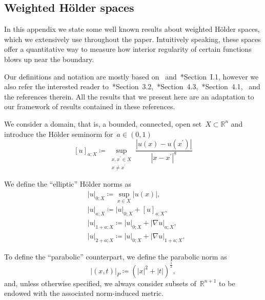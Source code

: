 \documentclass[12pt,a4paper]{amsart}
\numberwithin{equation}{section}
\theoremstyle{definition}
\theoremstyle{remark}
\newcommand{\R}{\mathbb{R}}
\newcommand{\abs}[1]{\left\lvert#1\right\rvert}
\begin{document}
\begin{appendix}

\section{Weighted Hölder spaces}\label{APP::WeightedHolder}

In this appendix we state some well known results about weighted Hölder spaces, which we extensively use throughout the paper. Intuitively speaking, these spaces offer a quantitative way to measure how interior regularity of certain functions blows up near the boundary.

Our definitions and notation are mostly based on~\cite{MR826642} and~\cite{MR241822}*{Section~I.1}, however we also refer the interested reader to~\cite{MR244627}*{Section~3.2},~\cite{MR1814364}*{Section~4.3},~\cite{MR1465184}*{Section~4.1},~\cite{MR588031} and the references therein. All the results that we present here are an adaptation to our framework of results contained in these references.

We consider a domain, that is, a bounded, connected, open set~$X \subset \R^n$ and introduce the Hölder seminorm for~$a \in (0,1)$
\begin{equation}\label{EQ::EllipticSeminormsDefinition}
    {\left[u\right]}_{a; X} \coloneq \sup_{\substack{x,x^\prime \in X\\x\neq x^\prime}} \frac{\abs{u(x) - u(x^\prime)}}{\abs{x-x^\prime}^a}
\end{equation}

We define the ``elliptic'' Hölder norms as
\begin{equation}\label{EQ::EllipticNormsDefinition}
    \begin{split}
        &\abs{u}_{0; X} \coloneq \sup_{x \in X} \abs{u(x)},\\
        &\abs{u}_{a; X} \coloneq \abs{u}_{0; X} + {\left[u\right]}_{a; X},\\
        &\abs{u}_{1+a; X} \coloneq \abs{u}_{0; X} + \abs{\nabla u}_{a; X},\\
        &\abs{u}_{2+a; X} \coloneq \abs{u}_{0; X} + \abs{\nabla u}_{1+a; X}.
    \end{split}
\end{equation}

To define the ``parabolic'' counterpart, we define the parabolic norm as
\begin{equation}\label{EQ::ParabolicDistanceDefinition}
    \abs{(x,t)}_P \coloneq {\left(\abs{x}^2 + \abs{t}\right)}^{\frac{1}{2}},
\end{equation}
and, unless otherwise specified, we always consider subsets of~$\R^{n+1}$ to be endowed with the associated norm-induced metric.


\end{appendix}
\end{document}
